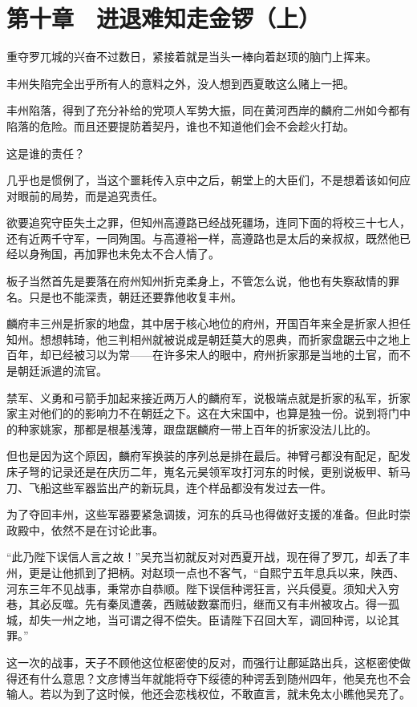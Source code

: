 \section{第十章　进退难知走金锣（上）}

重夺罗兀城的兴奋不过数日，紧接着就是当头一棒向着赵顼的脑门上挥来。

丰州失陷完全出乎所有人的意料之外，没人想到西夏敢这么赌上一把。

丰州陷落，得到了充分补给的党项人军势大振，同在黄河西岸的麟府二州如今都有陷落的危险。而且还要提防着契丹，谁也不知道他们会不会趁火打劫。

这是谁的责任？

几乎也是惯例了，当这个噩耗传入京中之后，朝堂上的大臣们，不是想着该如何应对眼前的局势，而是追究责任。

欲要追究守臣失土之罪，但知州高遵路已经战死疆场，连同下面的将校三十七人，还有近两千守军，一同殉国。与高遵裕一样，高遵路也是太后的亲叔叔，既然他已经以身殉国，再加罪也未免太不合人情了。

板子当然首先是要落在府州知州折克柔身上，不管怎么说，他也有失察敌情的罪名。只是也不能深责，朝廷还要靠他收复丰州。

麟府丰三州是折家的地盘，其中居于核心地位的府州，开国百年来全是折家人担任知州。想想韩琦，他三判相州就被说成是朝廷莫大的恩典，而折家盘踞云中之地上百年，却已经被习以为常——在许多宋人的眼中，府州折家那是当地的土官，而不是朝廷派遣的流官。

禁军、义勇和弓箭手加起来接近两万人的麟府军，说极端点就是折家的私军，折家家主对他们的的影响力不在朝廷之下。这在大宋国中，也算是独一份。说到将门中的种家姚家，那都是根基浅薄，跟盘踞麟府一带上百年的折家没法儿比的。

但也是因为这个原因，麟府军换装的序列总是排在最后。神臂弓都没有配足，配发床子弩的记录还是在庆历二年，嵬名元昊领军攻打河东的时候，更别说板甲、斩马刀、飞船这些军器监出产的新玩具，连个样品都没有发过去一件。

为了夺回丰州，这些军器要紧急调拨，河东的兵马也得做好支援的准备。但此时崇政殿中，依然不是在讨论此事。

“此乃陛下误信人言之故！”吴充当初就反对对西夏开战，现在得了罗兀，却丢了丰州，更是让他抓到了把柄。对赵顼一点也不客气，“自熙宁五年息兵以来，陕西、河东三年不见战事，秉常亦自恭顺。陛下误信种谔狂言，兴兵侵夏。须知犬入穷巷，其必反噬。先有秦凤遭袭，西贼破数寨而归，继而又有丰州被攻占。得一孤城，却失一州之地，当可谓之得不偿失。臣请陛下召回大军，调回种谔，以论其罪。”

这一次的战事，天子不顾他这位枢密使的反对，而强行让鄜延路出兵，这枢密使做得还有什么意思？文彦博当年就能将夺下绥德的种谔丢到随州四年，他吴充也不会输人。若以为到了这时候，他还会恋栈权位，不敢直言，就未免太小瞧他吴充了。


